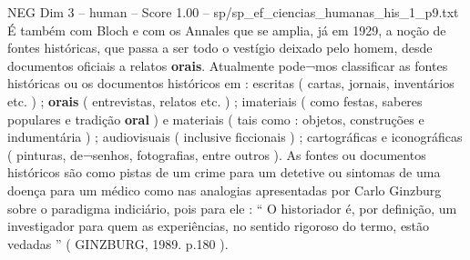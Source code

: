 \begin{textsample}{NEG Dim 3 – human – Score 1.00 – sp/sp\_ef\_ciencias\_humanas\_his\_1\_p9.txt}  \label{ex:f3_neg_016}
É também com Bloch e com os Annales que se amplia, já em 1929, a noção de fontes históricas, que passa a ser todo o vestígio deixado pelo homem, desde documentos oficiais a relatos \textbf{orais}.
Atualmente pode¬mos classificar as fontes históricas ou os documentos históricos em : escritas ( cartas, jornais, inventários etc. ) ; \textbf{orais} ( entrevistas, relatos etc. ) ; imateriais ( como festas, saberes populares e tradição \textbf{oral} ) e materiais ( tais como : objetos, construções e indumentária ) ; audiovisuais ( inclusive ficcionais ) ; cartográficas e iconográficas ( pinturas, de¬senhos, fotografias, entre outros ).
As fontes ou documentos históricos são como pistas de um crime para um detetive ou sintomas de uma doença para um médico como nas analogias apresentadas por Carlo Ginzburg sobre o paradigma indiciário, pois para ele : “ O historiador é, por definição, um investigador para quem as experiências, no sentido rigoroso do termo, estão vedadas ” ( GINZBURG, 1989. p.180 ).

\end{textsample}
